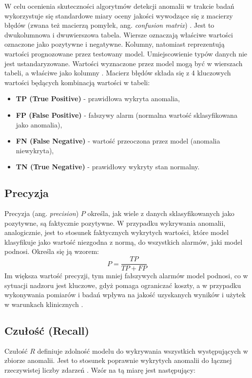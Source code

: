 \documentclass[a4paper,twoside,12pt]{book}
\newcommand{\obcy}[1]{\emph{#1}}
\newcommand{\english}[1]{{\selectlanguage{british}\obcy{#1}}}
\begin{document}
	W celu ocenienia skuteczności algorytmów detekcji anomalii w trakcie badań wykorzystuje się standardowe miary oceny jakości wywodzące się z macierzy błędów (zwana też macierzą pomyłek, ang. \english{confusion matrix}) \cite{yang2024confusion}. Jest to dwukolumnowa i dwuwierszowa tabela. Wiersze oznaczają właściwe wartości oznaczone jako pozytywne i negatywne. Kolumny, natomiast reprezentują wartości prognozowane przez testowany model. Umiejscowienie typów danych nie jest ustandaryzowane. Wartości wyznaczone przez model mogą być w wierszach tabeli, a właściwe jako kolumny \cite{yang2024confusion}. Macierz błędów składa się z 4 kluczowych wartości będących kombinacją wartości w tabeli:
	\begin{itemize}
		\item \textbf{TP (True Positive)} - prawidłowa wykryta anomalia,
		\item \textbf{FP (False  Positive)} - fałszywy alarm (normalna wartość sklasyfikowana jako anomalia),
		\item \textbf{FN (False Negative)} - wartość przeoczona przez model (anomalia niewykryta),
		\item \textbf{TN (True Negative)} - prawidłowy wykryty stan normalny.
	\end{itemize}
	
	\subsection{Precyzja}
	Precyzja {(ang. \english{precision})} $P$ określa, jak wiele z danych sklasyfikowanych jako pozytywne, są faktycznie pozytywne. W przypadku wykrywania anomalii, analogicznie, jest to stosunek faktycznych wykrytych wartości, które model klasyfikuje jako wartość niezgodna z normą, do wszystkich alarmów, jaki model podnosi. Określa się ją wzorem: 
	\begin{equation}
		P = \frac{TP}{TP + FP}
		\label{eq:precision}
	\end{equation} 
	Im większa wartość precyzji, tym mniej fałszywych alarmów model podnosi, co w sytuacji nadzoru jest kluczowe, gdyż pomaga ograniczać koszty, a w przypadku wykonywania pomiarów i badań wpływa na jakość uzyskanych wyników i użytek w warunkach klinicznych \cite{yang2024confusion}.
	
	\subsection{Czułość (Recall)}
	Czułość $R$ definiuje zdolność modelu do wykrywania wszystkich występujących w zbiorze anomalii. Jest to stosunek poprawnie wykrytych anomalii do łącznej rzeczywistej liczby zdarzeń \cite{sathyanarayanan2024confusion}. Wzór na tą miarę jest następujący:
	
\end{document}
